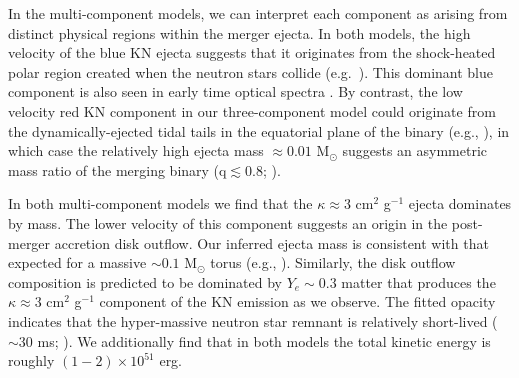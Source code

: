 In the multi-component models, we can interpret each component as arising from distinct physical regions within the merger ejecta. In both models, the high velocity of the blue KN ejecta suggests that it originates from the shock-heated polar region created when the neutron stars collide (e.g.~\citealt{Oechslin2007,Bauswein+13a,Sekiguchi+16}). This dominant blue component is also seen in early time optical spectra \citep{Nicholl+17a}. By contrast, the low velocity red KN component in our three-component model could originate from the dynamically-ejected tidal tails in the equatorial plane of the binary (e.g., \citealt{Rosswog+99,Hotokezaka+13}), in which case the relatively high ejecta mass $\approx 0.01$ M$_{\odot}$ suggests an asymmetric mass ratio of the merging binary (q$\lesssim0.8$; \citealt{Hotokezaka+13}).

In both multi-component models we find that the $\kappa\approx 3$ cm$^{2}$ g$^{-1}$ ejecta dominates by mass.  The lower velocity of this component suggests an origin in the post-merger accretion disk outflow.  Our inferred ejecta mass is consistent with that expected for a massive $\sim 0.1$ M$_{\odot}$ torus (e.g., \citealt{Just+15,SiegelMetzger17}).  Similarly, the disk outflow composition is predicted to be dominated by $Y_{e}\sim 0.3$ matter that produces the $\kappa\approx 3$ cm$^{2}$ g$^{-1}$ component of the KN emission \citep{Tanaka+18} as we observe. The fitted opacity indicates that the hyper-massive neutron star remnant is relatively short-lived ($\sim 30$ ms; \citealt{Fernandez+13,Just+15,Kasen+15}). We additionally find that in both models the total kinetic energy is roughly $(1-2)\times 10^{51}$ erg.

